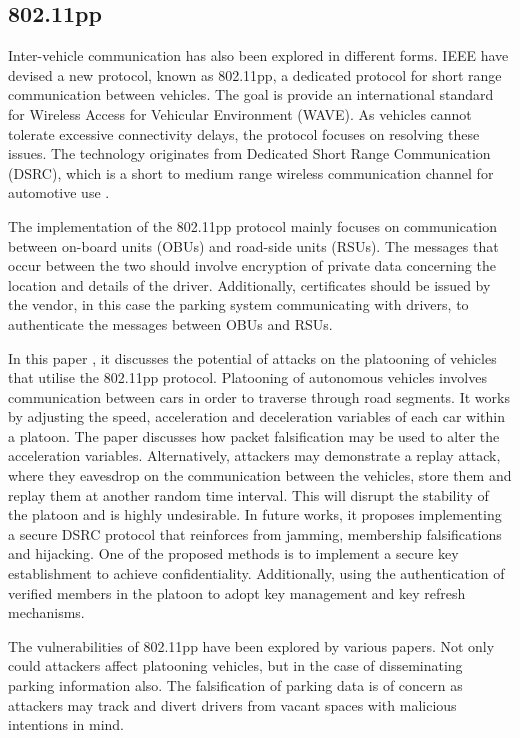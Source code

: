 \subsection{802.11pp}
Inter-vehicle communication has also been explored in different forms. IEEE have devised a new protocol, known as 802.11pp, a dedicated protocol for short range communication between vehicles. The goal is provide an international standard for Wireless Access for Vehicular Environment (WAVE). As vehicles cannot tolerate excessive connectivity delays, the protocol focuses on resolving these issues. The technology originates from Dedicated Short Range Communication (DSRC), which is a short to medium range wireless communication channel for automotive use \cite{dsrc}.

The implementation of the 802.11pp protocol mainly focuses on communication between on-board units (OBUs) and road-side units (RSUs). The messages that occur between the two should involve encryption of private data concerning the location and details of the driver. Additionally, certificates should be issued by the vendor, in this case the parking system communicating with drivers, to authenticate the messages between OBUs and RSUs.

In this paper \cite{ucar_security_2016}, it discusses the potential of attacks on the platooning of vehicles that utilise the 802.11pp protocol. Platooning of autonomous vehicles involves communication between cars in order to traverse through road segments. It works by adjusting the speed, acceleration and deceleration variables of each car within a platoon. The paper discusses how packet falsification may be used to alter the acceleration variables. Alternatively, attackers may demonstrate a replay attack, where they eavesdrop on the communication between the vehicles, store them and replay them at another random time interval. This will disrupt the stability of the platoon and is highly undesirable. In future works, it proposes implementing a secure DSRC protocol that reinforces from jamming, membership falsifications and hijacking. One of the proposed methods is to implement a secure key establishment to achieve confidentiality. Additionally, using the authentication of verified members in the platoon to adopt key management and key refresh mechanisms.

The vulnerabilities of 802.11pp have been explored by various papers. Not only could attackers affect platooning vehicles, but in the case of disseminating parking information also. The falsification of parking data is of concern as attackers may track and divert drivers from vacant spaces with malicious intentions in mind.